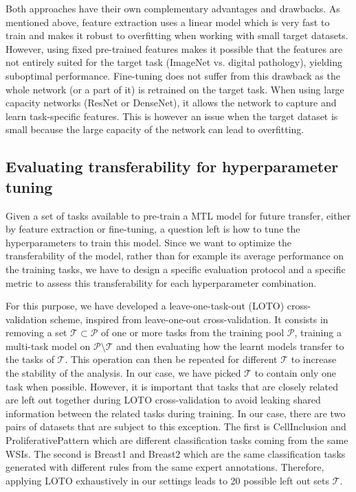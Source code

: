 Both approaches have their own complementary advantages and drawbacks. As mentioned above, feature extraction uses a linear model which is very fast to train and makes it robust to overfitting when working with small target datasets. However, using fixed pre-trained features makes it possible that the features are not entirely suited for the target task (\eg ImageNet vs. digital pathology), yielding suboptimal performance. Fine-tuning does not suffer from this drawback as the whole network (or a part of it) is retrained on the target task. When using large capacity networks (\eg ResNet or DenseNet), it allows the network to capture and learn task-specific features. This is however an issue when the target dataset is small because the large capacity of the network can lead to overfitting.

\subsection{Evaluating transferability for hyperparameter tuning}
\label{ssec:mtask:exp:transfer_eval}\label{ssec:mtask:exp:model_selection}

Given a set of tasks available to pre-train a MTL model for future transfer, either by feature extraction or fine-tuning, a question left is how to tune the hyperparameters to train this model. Since we want to optimize the transferability of the model, rather than for example its average performance on the training tasks, we have to design a specific evaluation protocol and a specific metric to assess this transferability for each hyperparameter combination.

For this purpose, we have developed a leave-one-task-out (LOTO) cross-validation scheme, inspired from leave-one-out cross-validation. It consists in removing a set $\mathcal{T} \subset \mathcal{P}$ of one or more tasks from the training pool $\mathcal{P}$, training a multi-task model on $\mathcal{P} \setminus \mathcal{T}$ and then evaluating how the learnt models transfer to the tasks of $\mathcal{T}$. This operation can then be repeated for different $\mathcal{T}$ to increase the stability of the analysis. In our case, we have picked $\mathcal{T}$ to contain only one task when possible. However, it is important that tasks that are closely related are left out together during LOTO cross-validation to avoid leaking shared information between the related tasks during training. In our case, there are two pairs of datasets that are subject to this exception. The first is CellInclusion and ProliferativePattern which are different classification tasks coming from the same WSIs. The second is Breast1 and Breast2 which are the same classification tasks generated with different rules from the same expert annotations. Therefore, applying LOTO exhaustively in our settings leads to 20 possible left out sets $\mathcal{T}$. 

